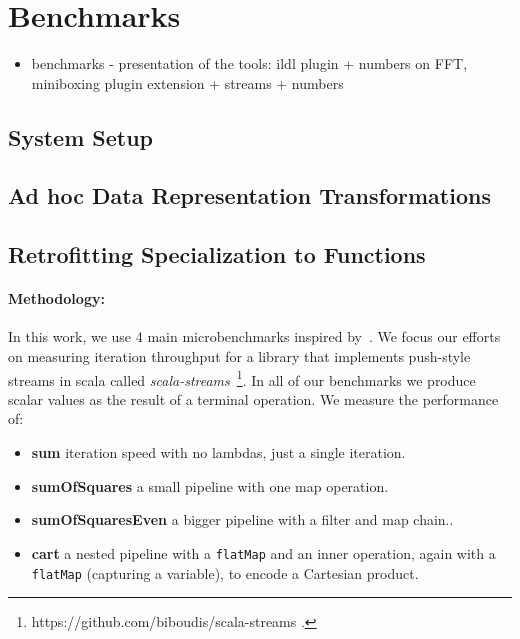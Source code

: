 \section{Benchmarks}
\label{sec:benchmarks}
\begin{itemize}
  \item benchmarks - presentation of the tools: ildl plugin + numbers on FFT, miniboxing plugin extension + streams + numbers
\end{itemize}

\subsection{System Setup}

\subsection{Ad hoc Data Representation Transformations}
\label{sec:benchmarks:ad-hoc}

\subsection{Retrofitting Specialization to Functions}
\label{sec:benchmarks:funcs}

\paragraph{Methodology: } In this work, we use 4 main microbenchmarks inspired
by~\cite{biboudis_clash_2014}. We focus our efforts on measuring iteration
throughput for a library that implements push-style streams in scala called
\emph{scala-streams}~\footnote{https://github.com/biboudis/scala-streams .}. In
all of our benchmarks we produce scalar values as the result of a terminal
operation. We measure the performance of:

\begin{itemize}
 \item \textbf{sum} iteration speed with no lambdas, just a single iteration.
 \item \textbf{sumOfSquares} a small pipeline with one map operation.
 \item \textbf{sumOfSquaresEven} a bigger pipeline with a filter and map chain..
 \item \textbf{cart} a nested pipeline with a \verb|flatMap| and an inner
   operation, again with a \verb|flatMap| (capturing a variable), to encode a
   Cartesian product.
\end{itemize}

